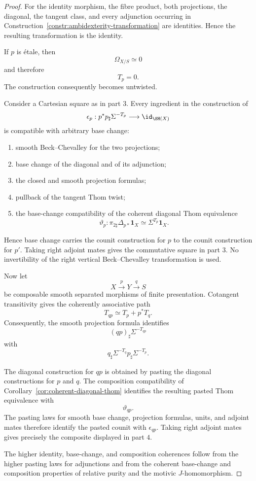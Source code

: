 \begin{proof}
For the identity morphism, the fibre product, both projections, the
diagonal, the tangent class, and every adjunction occurring in
Construction~\ref{constr:ambidexterity-transformation}
are identities.  Hence the resulting transformation is the identity.

If \(p\) is \'{e}tale, then
\[
    \Omega_{X/S}\simeq0
\]
and therefore
\[
    T_p=0.
\]
The construction consequently becomes untwisted.

Consider a Cartesian square as in part \(3\).  Every ingredient in the
construction of
\[
    \epsilon_p:
    p^*p_\sharp\Sigma^{-T_p}
    \longrightarrow
    \id_{\SH(X)}
\]
is compatible with arbitrary base change:

\begin{enumerate}
    \item smooth Beck--Chevalley for the two projections;

    \item base change of the diagonal and of its adjunction;

    \item the closed and smooth projection formulas;

    \item pullback of the tangent Thom twist;

    \item the base-change compatibility of the coherent diagonal Thom
    equivalence
    \[
        \vartheta_p:
        \pi_{2\sharp}\Delta_{p*}\mathbf1_X
        \simeq
        \Sigma^{T_p}\mathbf1_X.
    \]
\end{enumerate}

Hence base change carries the counit construction for \(p\) to the counit
construction for \(p'\).  Taking right adjoint mates gives the commutative
square in part \(3\).  No invertibility of the right vertical
Beck--Chevalley transformation is used.

Now let
\[
    X\xrightarrow{p}Y\xrightarrow{q}S
\]
be composable smooth separated morphisms of finite presentation.
Cotangent transitivity gives the coherently associative path
\[
    T_{qp}
    \simeq
    T_p+p^*T_q.
\]
Consequently, the smooth projection formula identifies
\[
    (qp)_\sharp\Sigma^{-T_{qp}}
\]
with
\[
    q_\sharp\Sigma^{-T_q}
    p_\sharp\Sigma^{-T_p}.
\]

The diagonal construction for \(qp\) is obtained by pasting the diagonal
constructions for \(p\) and \(q\).  The composition compatibility of
Corollary~\ref{cor:coherent-diagonal-thom}
identifies the resulting pasted Thom equivalence with
\[
    \vartheta_{qp}.
\]
The pasting laws for smooth base change, projection formulas, units, and
adjoint mates therefore identify the pasted counit with
\(\epsilon_{qp}\).  Taking right adjoint mates gives precisely the composite
displayed in part \(4\).

The higher identity, base-change, and composition coherences follow from the
higher pasting laws for adjunctions and from the coherent base-change and
composition properties of relative purity and the motivic
\(J\)-homomorphism.
\end{proof}

